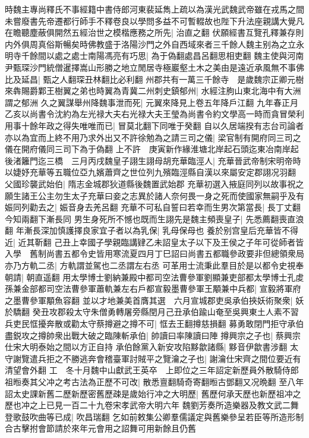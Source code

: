 時魏主專尚釋氏不事經籍中書侍郎河東裴延雋上疏以為漢光武魏武帝雖在戎馬之間未嘗廢書先帝遷都行師手不釋卷良以學問多益不可暫輟故也陛下升法座親講大覺凡在瞻聽塵蔽俱開然五經治世之模楷應務之所先|{
	治直之翻}
伏願經書互覽孔釋兼存則内外俱周真俗斯暢矣時佛教盛于洛陽沙門之外自西域來者三千餘人魏主别為之立永明寺千餘間以處之處士南陽馮亮有巧思|{
	為于偽翻處昌呂翻思相吏翻}
魏主使與河南尹甄琛沙門統僧暹擇嵩山形勝之地立閒居寺極巖壑土木之美由是遠近承風無不事佛比及延昌|{
	甄之人翻琛丑林翻比必利翻}
州郡共有一萬三千餘寺　是歲魏宗正卿元樹來犇賜爵鄴王樹翼之弟也時翼為青冀二州刺史鎮郁州|{
	水經注朐山東北海中有大洲謂之郁洲}
久之翼謀舉州降魏事泄而死|{
	元翼來降見上卷五年降戶江翻}
九年春正月乙亥以尚書令沈約為左光禄大夫右光禄大夫王瑩為尚書令約文學高一時而貪冒榮利用事十餘年政之得失唯唯而已|{
	冒莫北翻下同唯于癸翻}
自以久居端揆有志台司論者亦以為宜而上終不用乃求外出又不許徐勉為之請三司之儀|{
	梁官制有開府同三司之儀在開府儀同三司下為于偽翻}
上不許　庚寅新作緣淮塘北岸起石頭迄東冶南岸起後渚籬門迄三橋　三月丙戌魏皇子詡生詡母胡充華臨涇人|{
	充華晉武帝制宋明帝時以婕妤充華等五職位亞九嬪蕭齊之世位列九殯臨涇縣自漢以來屬安定郡詡况羽翻}
父國珍襲武始伯|{
	隋志金城郡狄道縣後魏置武始郡}
充華初選入掖庭同列以故事祝之願生諸王公主勿生太子充華曰妾之志異於諸人奈何畏一身之死而使國家無嗣乎及有娠同列勸去之|{
	娠音身去羌呂翻}
充華不可私自誓曰若幸而生男次第當長|{
	長丁丈翻今知兩翻下漸長同}
男生身死所不憾也既而生詡先是魏主頻喪皇子|{
	先悉薦翻喪直浪翻}
年漸長深加慎護擇良家宜子者以為乳保|{
	乳母保母也}
養於别宫皇后充華皆不得近|{
	近其靳翻}
己丑上幸國子學親臨講肄乙未詔皇太子以下及王侯之子年可從師者皆入學　舊制尚書五都令史皆用寒流夏四月丁巳詔曰尚書五都職參政要非但總領衆局亦乃方軌二丞|{
	方軌謂並駕也二丞謂左右丞}
可革用士流秉此羣目於是以都令史視奉朝請|{
	朝直遥翻}
用太學博士劉納兼殿中都司空法曹參軍劉顯兼吏部都太學博士孔䖍孫兼金部都司空法曹參軍蕭軌兼左右戶都宣毅墨曹參軍王顒兼中兵都|{
	宣毅將軍府之墨曹參軍顒魚容翻}
並以才地兼美首膺其選　六月宣城郡吏吳承伯挾妖術聚衆|{
	妖於驕翻}
癸丑攻郡殺太守朱僧勇轉屠旁縣閏月己丑承伯踰山奄至吳興東土人素不習兵吏民恇擾奔散或勸太守蔡撙避之撙不可|{
	恇去王翻撙慈損翻}
募勇敢閉門拒守承伯盡鋭攻之撙帥衆出戰大破之臨陳斬承伯|{
	帥讀曰率陳讀曰陣}
撙興宗之子也|{
	蔡興宗仕宋大明泰始之間以方正自持}
承伯餘黨入新安攻陷黟歙諸縣|{
	黟音伊歙書涉翻}
太守謝覽遣兵拒之不勝逃奔會稽臺軍討賊平之覽瀹之子也|{
	謝瀹仕宋齊之間位要近有清望會外翻}
工　冬十月魏中山獻武王英卒　上即位之三年詔定新歷員外散騎侍郎祖暅奏其父冲之考古法為正歷不可改|{
	散悉亶翻騎奇寄翻暅古鄧翻又况晩翻}
至八年詔太史課新舊二歷新歷密舊歷疎是歲始行冲之大明歷|{
	舊歷何承天歷也新歷祖冲之歷也冲之上已見一百二十九卷宋孝武帝大明六年}
魏劉芳奏所造樂器及教文武二舞登歌鼓吹曲等已成|{
	吹昌瑞翻}
乞如前敕集公卿羣儒議定與舊樂參呈若臣等所造形制合古擊拊會節請於來年元會用之詔舞可用新餘且仍舊

